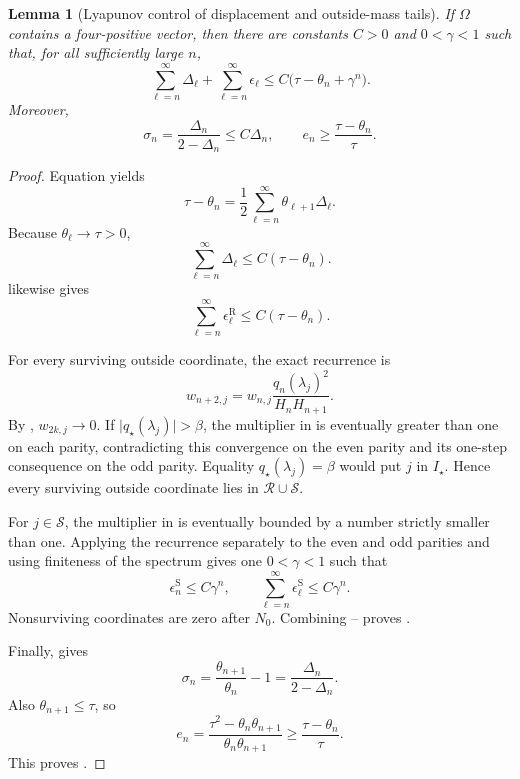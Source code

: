 \documentclass[11pt]{article}
\newtheorem{lemma}{Lemma}[section]
\begin{document}
\begin{lemma}[Lyapunov control of displacement and outside-mass tails]
\label{lem:outside-tail}
If \(\Omega\) contains a four-positive vector, then there are constants
\(C>0\) and \(0<\gamma<1\) such that, for all sufficiently large \(n\),
\[
 \sum_{\ell=n}^{\infty}\Delta_\ell+
 \sum_{\ell=n}^{\infty}\epsilon_\ell
 \leq C\bigl(\tau-\theta_n+\gamma^n\bigr).
\tag{30}\label{eq:combined-tail}
\]
Moreover,
\[
 \sigma_n=\frac{\Delta_n}{2-\Delta_n}\leq C\Delta_n,\qquad
 e_n\geq\frac{\tau-\theta_n}{\tau}.
\tag{31}\label{eq:sigma-e-relations}
\]
\end{lemma}

\begin{proof}
Equation  yields
\[
 \tau-\theta_n
 =\frac12\sum_{\ell=n}^{\infty}\theta_{\ell+1}\Delta_\ell.
\tag{32}\label{eq:exact-displacement-tail}
\]
Because \(\theta_\ell\to\tau>0\),
\[
 \sum_{\ell=n}^{\infty}\Delta_\ell
 \leq C(\tau-\theta_n).
\tag{33}\label{eq:displacement-tail}
\]
 likewise gives
\[
 \sum_{\ell=n}^{\infty}\epsilon_\ell^{\mathrm R}
 \leq C(\tau-\theta_n).
\tag{34}\label{eq:resonant-mass-tail}
\]

For every surviving outside coordinate, the exact recurrence is
\[
 w_{n+2,j}
 =w_{n,j}\frac{q_n(\lambda_j)^2}{H_nH_{n+1}}.
\tag{35}\label{eq:outside-two-step}
\]
By , \(w_{2k,j}\to0\).  If
\(\lvert q_\star(\lambda_j)\rvert>\beta\), the multiplier in
 is eventually greater than one on each parity,
contradicting this convergence on the even parity and its one-step
consequence on the odd parity.  Equality
\(q_\star(\lambda_j)=\beta\) would put \(j\) in \(I_\star\).  Hence every
surviving outside coordinate lies in \(\mathcal R\cup\mathcal S\).

For \(j\in\mathcal S\), the multiplier in
 is eventually bounded by a number strictly
smaller than one.  Applying the recurrence separately to the even and odd
parities and using finiteness of the spectrum gives one
\(0<\gamma<1\) such that
\[
 \epsilon_n^{\mathrm S}\leq C\gamma^n,\qquad
 \sum_{\ell=n}^{\infty}\epsilon_\ell^{\mathrm S}
 \leq C\gamma^n.
\tag{36}\label{eq:strict-mass-tail}
\]
Nonsurviving coordinates are zero after \(N_0\).
Combining --
proves .

Finally,  gives
\[
 \sigma_n=\frac{\theta_{n+1}}{\theta_n}-1
 =\frac{\Delta_n}{2-\Delta_n}.
\]
Also \(\theta_{n+1}\leq\tau\), so
\[
 e_n
 =\frac{\tau^2-\theta_n\theta_{n+1}}
        {\theta_n\theta_{n+1}}
 \geq\frac{\tau-\theta_n}{\tau}.
\]
This proves .
\end{proof}
\end{document}
